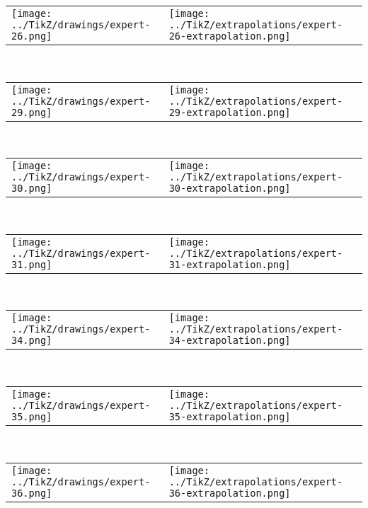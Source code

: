            \begin{tabular}{ll}
    \texttt{[image: ../TikZ/drawings/expert-26.png]}&
    \texttt{[image: ../TikZ/extrapolations/expert-26-extrapolation.png]}
    \end{tabular}        
            \\

            \begin{tabular}{ll}
    \texttt{[image: ../TikZ/drawings/expert-29.png]}&
    \texttt{[image: ../TikZ/extrapolations/expert-29-extrapolation.png]}
    \end{tabular}        
            \\

            \begin{tabular}{ll}
    \texttt{[image: ../TikZ/drawings/expert-30.png]}&
    \texttt{[image: ../TikZ/extrapolations/expert-30-extrapolation.png]}
    \end{tabular}        
            \\

            \begin{tabular}{ll}
    \texttt{[image: ../TikZ/drawings/expert-31.png]}&
    \texttt{[image: ../TikZ/extrapolations/expert-31-extrapolation.png]}
    \end{tabular}        
            \\

            \begin{tabular}{ll}
    \texttt{[image: ../TikZ/drawings/expert-34.png]}&
    \texttt{[image: ../TikZ/extrapolations/expert-34-extrapolation.png]}
    \end{tabular}        
            \\

            \begin{tabular}{ll}
    \texttt{[image: ../TikZ/drawings/expert-35.png]}&
    \texttt{[image: ../TikZ/extrapolations/expert-35-extrapolation.png]}
    \end{tabular}        
            \\

            \begin{tabular}{ll}
    \texttt{[image: ../TikZ/drawings/expert-36.png]}&
    \texttt{[image: ../TikZ/extrapolations/expert-36-extrapolation.png]}
    \end{tabular}        
            \\

